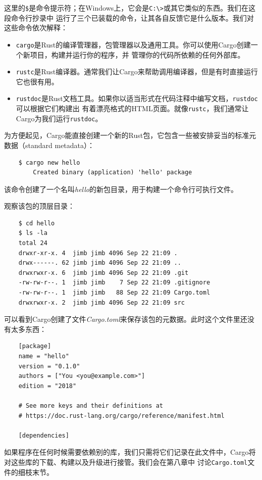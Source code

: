 \smallskip
这里的\texttt{\$}是命令提示符；在Windows上，它会是\texttt{C:\textbackslash>}或其它类似的东西。我们在这段命令行抄录中
运行了三个已装载的命令，让其各自反馈它是什么版本。我们对这些命令依次解释：

\smallskip
\begin{itemize}
    \item \texttt{cargo}是Rust的编译管理器，包管理器以及通用工具。你可以使用Cargo创建一个新项目，构建并运行你的程序，并
    管理你的代码所依赖的任何外部库。
    \item \texttt{rustc}是Rust编译器。通常我们让Cargo来帮助调用编译器，但是有时直接运行它也很有用。
    \item \texttt{rustdoc}是Rust文档工具。如果你以适当形式在代码注释中编写文档，\texttt{rustdoc}可以根据它们构建出
    有着漂亮格式的HTML页面。就像\texttt{rustc}，我们通常让Cargo为我们运行\texttt{rustdoc}。
\end{itemize}

\smallskip
为方便起见，Cargo能直接创建一个新的Rust包，它包含一些被安排妥当的标准元数据（standard metadata）：
\begin{verbatim}
    $ cargo new hello
        Created binary (application) 'hello' package
\end{verbatim}

\smallskip
该命令创建了一个名叫\textit{hello}的新包目录，用于构建一个命令行可执行文件。

\medskip
观察该包的顶层目录：
\begin{verbatim}
    $ cd hello
    $ ls -la
    total 24
    drwxr-xr-x. 4  jimb jimb 4096 Sep 22 21:09 .
    drwx------. 62 jimb jimb 4096 Sep 22 21:09 ..
    drwxrwxr-x. 6  jimb jimb 4096 Sep 22 21:09 .git
    -rw-rw-r--. 1  jimb jimb    7 Sep 22 21:09 .gitignore
    -rw-rw-r--. 1  jimb jimb   88 Sep 22 21:09 Cargo.toml
    drwxrwxr-x. 2  jimb jimb 4096 Sep 22 21:09 src
\end{verbatim}

\smallskip
可以看到Cargo创建了文件\textit{Cargo.toml}来保存该包的元数据。此时这个文件里还没有太多东西：
\begin{verbatim}
    [package]
    name = "hello"
    version = "0.1.0"
    authors = ["You <you@example.com>"]
    edition = "2018"
    
    # See more keys and their definitions at 
    # https://doc.rust-lang.org/cargo/reference/manifest.html
    
    [dependencies]
\end{verbatim}

\smallskip
如果程序在任何时候需要依赖别的库，我们只需将它们记录在此文件中，Cargo将对这些库的下载、构建以及升级进行接管。我们会在第八章中
讨论\texttt{Cargo.toml}文件的细枝末节。

